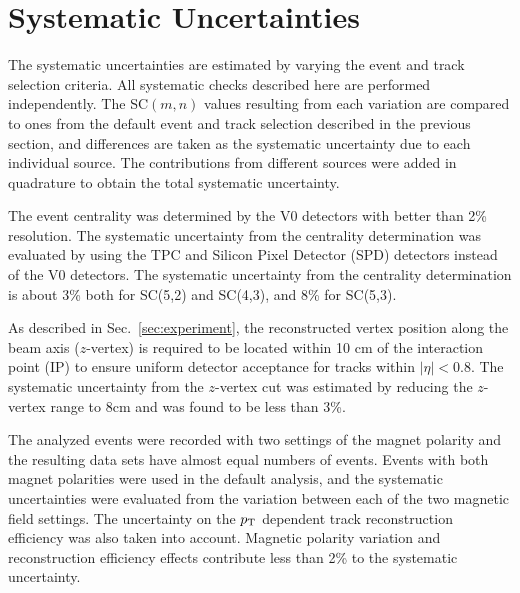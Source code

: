 \section{Systematic Uncertainties}
\label{sec:uncertainties}



The systematic uncertainties are estimated by varying the event and track selection criteria. All systematic checks described here are performed independently. 
The SC$(m,n)$ values resulting from each variation are compared to ones from the default event and track selection described in the previous section,
and differences are taken as the systematic uncertainty due to each individual source.
The contributions from different sources were added in quadrature to obtain the total systematic uncertainty.

The event centrality was determined by the V0 detectors \cite{Abbas:2013taa} with better than 2\%  resolution. The systematic uncertainty from the centrality determination was evaluated by using the TPC and Silicon Pixel Detector (SPD) \cite{Dellacasa:1999kf} detectors instead of the V0 detectors. The systematic uncertainty from the centrality determination is about 3\% both for SC(5,2) and SC(4,3), and 8\% for  SC(5,3).

As described in Sec.~\ref{sec:experiment}, the reconstructed vertex position along the beam axis ($z$-vertex) is required to be located within 10 cm of the interaction point (IP) to ensure uniform detector acceptance for tracks within $|\eta|<0.8$. The systematic uncertainty from the $z$-vertex cut was estimated by reducing the $z$-vertex range to 8cm and was found to be less than 3\%.  

The analyzed events were recorded with two settings of the magnet polarity and the resulting data sets have almost equal numbers of events. Events with both magnet polarities were used in the default analysis, and the systematic uncertainties were evaluated from the variation between each of the two magnetic field settings. 
The uncertainty on the $p_{\rm T}$ dependent track reconstruction efficiency was also taken into account.
Magnetic polarity variation and reconstruction efficiency effects contribute less than 2\% to the systematic uncertainty.

